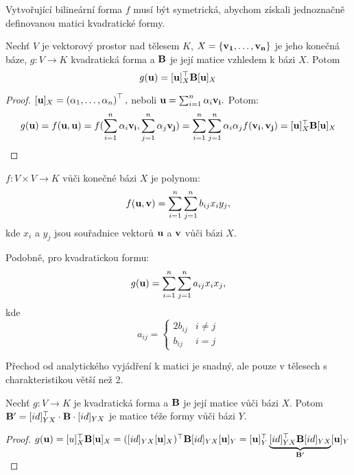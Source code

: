 \begin{remark}
    Vytvořující bilineární forma $f$ musí být symetrická, abychom
    získali jednoznačně definovanou matici kvadratické formy.
\end{remark}

\begin{observation}
    Nechť $V$ je vektorový prostor nad tělesem $K$, $X = \{\mathbf{v_1}, \dots, \mathbf{v_n}\}$
    je jeho konečná báze, $g: V \rightarrow K$ kvadratická forma a $\mathbf{B}$ je její 
    matice vzhledem k bázi $X$. Potom $$g(\mathbf{u}) = [\mathbf{u}]_X^\top \mathbf{B} [\mathbf{u}]_X$$
\end{observation}

\begin{proof}
    $[\mathbf{u}]_X = \left( \alpha_1, \dots, \alpha_n\right)^\top,$ neboli $\mathbf{u} = 
    \sum_{i=1}^n \alpha_i\mathbf{v_i}.$ Potom:
    $$g(\mathbf{u}) = f(\mathbf{u}, \mathbf{u}) = f(\sum_{i=1}^n\alpha_i\mathbf{v_i}, \sum_{j=1}^n \alpha_j
    \mathbf{v_j}) = \sum_{i=1}^n\sum_{j=1}^n \alpha_i \alpha_j f(\mathbf{v_i}, \mathbf{v_j}) =
    [\mathbf{u}]_X^\top \mathbf{B} [\mathbf{u}]_X$$
\end{proof}

\begin{definition}
     $f:V \times V \rightarrow K$
    vůči konečné bázi $X$ je polynom:
    $$f(\mathbf{u}, \mathbf{v}) = \sum_{i=1}^n \sum_{j=1}^n b_{ij} x_i y_j,$$
    kde $x_i$ a $y_j$ jsou souřadnice vektorů $\mathbf{u}$ a $\mathbf{v}$ vůči bázi $X$.

    Podobně, pro kvadratickou formu:
    $$g(\mathbf{u}) = \sum_{i=1}^n \sum_{j=1}^n a_{ij}x_ix_j,$$
    kde $$a_{ij} = \begin{cases}
        2b_{ij} &i \neq j \\
        b_{ij} &i=j
    \end{cases}$$
\end{definition}

\begin{remark}
    Přechod od analytického vyjádření k matici je snadný, ale pouze v tělesech
    s charakteristikou větší než 2.
\end{remark}

\begin{observation}
    Nechť $g: V \rightarrow K$ je kvadratická forma a $\mathbf{B}$ je její matice vůči
    bázi $X$. Potom $\mathbf{B}' = [id]_{YX}^\top \cdot \mathbf{B} \cdot [id]_{YX}$ je matice téže formy
    vůči bázi $Y$.
\end{observation}

\begin{proof}
    $g(\mathbf{u}) = [u]_X^\top \mathbf{B} [\mathbf{u}]_X = ([id]_{YX}[\mathbf{u}]_X)^\top \mathbf{B} 
    [id]_{YX}[\mathbf{u}]_Y = [\mathbf{u}]_Y^\top \underbrace{[id]_{YX}^\top \mathbf{B} 
    [id]_{YX}}_{\mathbf{B}'} [\mathbf{u}]_Y$
\end{proof}

